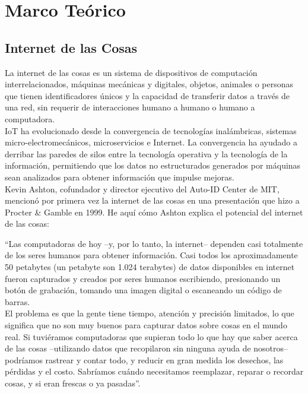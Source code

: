\section{Marco Teórico}

\subsection{Internet de las Cosas}

La internet de las cosas es un sistema de dispositivos de computación interrelacionados, máquinas mecánicas y digitales, objetos, animales o personas que tienen identificadores únicos y la capacidad de transferir datos a través de una red, sin requerir de interacciones humano a humano o humano a computadora. \\

IoT ha evolucionado desde la convergencia de tecnologías inalámbricas, sistemas micro-electromecánicos, microservicios e Internet. La convergencia ha ayudado a derribar las paredes de silos entre la tecnología operativa y la tecnología de la información, permitiendo que los datos no estructurados generados por máquinas sean analizados para obtener información que impulse mejoras. \cite{TechT2017}\\

Kevin Ashton, cofundador y director ejecutivo del Auto-ID Center de MIT, mencionó por primera vez la internet de las cosas en una presentación que hizo a Procter \& Gamble en 1999. He aquí cómo Ashton explica el potencial del internet de las cosas:

``Las computadoras de hoy –y, por lo tanto, la internet– dependen casi totalmente de los seres humanos para obtener información. Casi todos los aproximadamente 50 petabytes (un petabyte son 1.024 terabytes) de datos disponibles en internet fueron capturados y creados por seres humanos escribiendo, presionando un botón de grabación, tomando una imagen digital o escaneando un código de barras. \\

El problema es que la gente tiene tiempo, atención y precisión limitados, lo que significa que no son muy buenos para capturar datos sobre cosas en el mundo real. Si tuviéramos computadoras que supieran todo lo que hay que saber acerca de las cosas –utilizando datos que recopilaron sin ninguna ayuda de nosotros– podríamos rastrear y contar todo, y reducir en gran medida los desechos, las pérdidas y el costo. Sabríamos cuándo necesitamos reemplazar, reparar o recordar cosas, y si eran frescas o ya pasadas”. \cite{Asthon2009}

